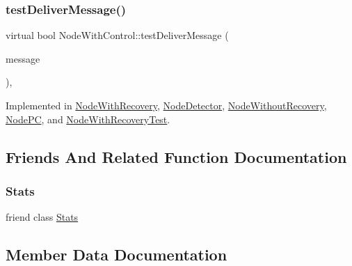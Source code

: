\mbox{\label{classNodeWithControl_a84df0beabbaed80e7da017d592480515}} 
\subsubsection{\texorpdfstring{test\+Deliver\+Message()}{testDeliverMessage()}}
{\footnotesize\ttfamily virtual bool Node\+With\+Control\+::test\+Deliver\+Message (\begin{DoxyParamCaption}\item[{const \hyperlink{structures_8h_a7e7bdc1d2fff8a9436f2f352b2711ed6}{message\+Info} \&}]{message }\end{DoxyParamCaption})\hspace{0.3cm}{\ttfamily [protected]}, {}}



Implemented in \hyperlink{classNodeWithRecovery_aec147b3723b3dab00f9610453ba8daba}{Node\+With\+Recovery}, \hyperlink{classNodeDetector_a51e7dccd54e94bbe937752ca39dfdba4}{Node\+Detector}, \hyperlink{classNodeWithoutRecovery_a8cf83ec6d0af26e385dcde0bc03f5b6d}{Node\+Without\+Recovery}, \hyperlink{classNodePC_a54731196935596e0c6f094a5a8420134}{Node\+PC}, and \hyperlink{classNodeWithRecoveryTest_af9b78d0ed4fefb97e2f54c9279aa4655}{Node\+With\+Recovery\+Test}.



\subsection{Friends And Related Function Documentation}
\mbox{\label{classNodeWithControl_a129f65b6976377739eb6231b6962985e}} 
\subsubsection{\texorpdfstring{Stats}{Stats}}
{\footnotesize\ttfamily friend class \hyperlink{classStats}{Stats}\hspace{0.3cm}{\ttfamily [friend]}}



\subsection{Member Data Documentation}
\mbox{\label{classNodeWithControl_a051a7d7f2452f1f8da3bc5bfb05a7760}} 
